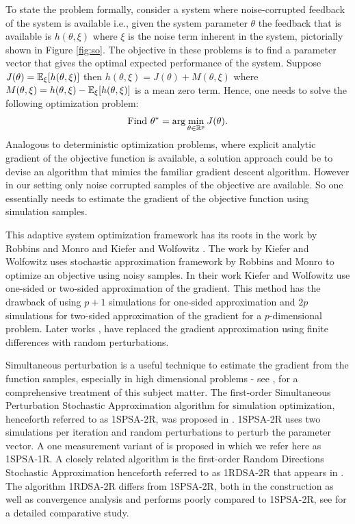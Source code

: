 \documentclass[letterpaper, 10 pt, conference]{ieeeconf}  %
\begin{document}
To state the problem formally, consider a system where noise-corrupted feedback of the 
system is available i.e., given the system parameter $\theta$ the feedback that is 
available is $h(\theta, \xi)$ where $\xi$ is the noise term inherent in the system, 
pictorially shown in Figure \ref{fig:so}. The objective in these problems is to find a 
parameter vector that gives the optimal expected performance of the system. 
Suppose $J(\theta)=\mathbb{E}_{\xi}[h(\theta, \xi)]$ then $h(\theta, \xi)=J(\theta)+M(\theta,\xi)$ 
where $M(\theta,\xi)=h(\theta, \xi)-\mathbb{E}_{\xi}[h(\theta, \xi)]$ is a mean zero term. Hence, one 
needs to solve the following optimization problem:
\begin{align}
\mbox{Find } \theta^* = \arg\min_{\theta \in \mathbb{R}^p} J(\theta). \label{eq:pb}
\end{align}
Analogous to deterministic optimization problems, where explicit analytic gradient of the 
objective function is available, a solution approach could be to devise an algorithm that 
mimics the familiar gradient descent algorithm. However in our setting only noise corrupted 
samples of the objective are available. So one essentially needs to estimate the gradient 
of the objective function using simulation samples.

This adaptive system optimization framework has its roots in the work by 
Robbins and Monro \cite{robbins1951} and Kiefer and Wolfowitz \cite{kiefer1952}. 
The work by Kiefer and Wolfowitz uses stochastic approximation framework by 
Robbins and Monro to optimize an objective using noisy samples. In their work
Kiefer and Wolfowitz \cite{kiefer1952} use 
one-sided or two-sided approximation of the gradient. 
This method has the drawback of using $p+1$ simulations for one-sided approximation and
$2p$ simulations for two-sided approximation of the gradient for a 
$p$-dimensional problem. Later works \cite{kushcla},\cite{spall} have replaced the 
gradient approximation using finite differences with random perturbations.

Simultaneous perturbation is a useful technique to estimate the gradient from the function 
samples, especially in high dimensional problems - see \cite{bhatnagar-book},
\cite{spallbook} for a comprehensive treatment of this subject matter.
The first-order Simultaneous Perturbation Stochastic Approximation algorithm for 
simulation optimization, henceforth referred to as 1SPSA-2R, was 
proposed in \cite{spall}. 1SPSA-2R uses two simulations per iteration and random 
perturbations to perturb the parameter vector. 
A one measurement variant of \cite{spall} is proposed in \cite{spall2} which we refer here
as 1SPSA-1R.
A closely related algorithm is the first-order Random Directions 
Stochastic Approximation henceforth referred to as 1RDSA-2R that appears in
\cite[pp.~58-60]{kushcla}.
The algorithm 1RDSA-2R differs from 1SPSA-2R, both in the construction as well as 
convergence analysis and performs poorly compared to 1SPSA-2R, see 
\cite{chin1997comparative} for a detailed comparative study. 
\end{document}
